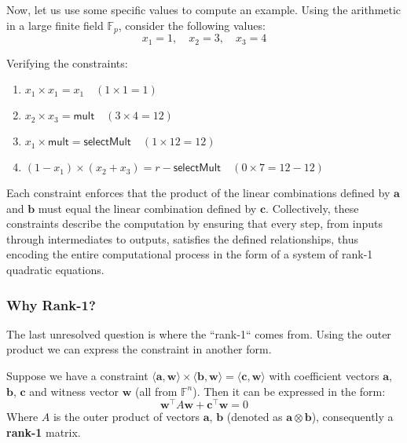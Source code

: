 \documentclass[../lecture-notes.tex]{subfiles}
\begin{document}
\begin{example}
    Now, let us use some specific values to compute an example. Using the arithmetic in a large finite
    field $\mathbb{F}_p$, consider the following values:
    \begin{equation*}
        x_1 = 1, \quad x_2 = 3, \quad x_3 = 4
    \end{equation*}

    Verifying the constraints:
    \begin{enumerate}
        \item \( x_1 \times x_1 = x_1 \quad (1 \times 1 = 1) \)
        \item \( x_2 \times x_3 = \mathsf{mult} \quad (3 \times 4 = 12) \)
        \item \( x_1 \times \mathsf{mult} = \mathsf{selectMult} \quad (1 \times 12 = 12) \)
        \item \( (1 - x_1) \times (x_2 + x_3) = r - \mathsf{selectMult} \quad (0 \times 7 = 12 - 12) \)
    \end{enumerate}
\end{example}

Each constraint enforces that the product of the linear combinations defined by $\mathbf{a}$ and $\mathbf{b}$ must
equal the linear combination defined by $\mathbf{c}$. Collectively, these constraints describe the 
computation by ensuring that every step, from inputs through intermediates to outputs, satisfies 
the defined relationships, thus encoding the entire computational process in the form of a system
of rank-1 quadratic equations.

\subsubsection{Why Rank-1?}
The last unresolved question is where the ``rank-1`` comes from. Using the outer product we can express the constraint in another form.

\begin{lemma}
    Suppose we have a constraint $\langle \mathbf{a}, \mathbf{w}\rangle \times \langle \mathbf{b}, \mathbf{w}\rangle = \langle \mathbf{c}, \mathbf{w} \rangle$ 
    with coefficient vectors $\mathbf{a}$, $\mathbf{b}$, $\mathbf{c}$ and witness vector $\mathbf{w}$ (all from $\mathbb{F}^n$). Then it can be expressed in the 
    form:
    \[ \mathbf{w}^{\top} A \mathbf{w} + \mathbf{c}^{\top} \mathbf{w} = 0 \]
    Where $A$ is the outer product of vectors $\mathbf{a}$, $\mathbf{b}$ (denoted as $\mathbf{a} \otimes \mathbf{b}$), consequently 
    a \textbf{rank-1} matrix.
\end{lemma}
\end{document}
